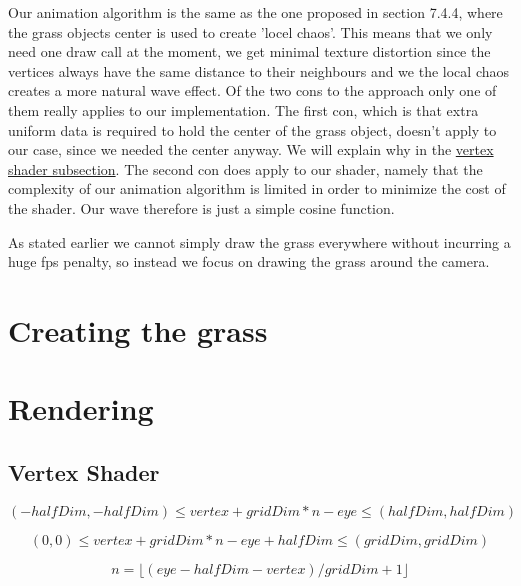 Our animation algorithm is the same as the one proposed in section
7.4.4, where the grass objects center is used to create 'locel
chaos'. This means that we only need one draw call at the moment, we
get minimal texture distortion since the vertices always have the same
distance to their neighbours and we the local chaos creates a more
natural wave effect. Of the two cons to the approach only one of them
really applies to our implementation. The first con, which is that
extra uniform data is required to hold the center of the grass object,
doesn't apply to our case, since we needed the center anyway. We will
explain why in the \hyperref[sec:grassVert]{vertex shader
  subsection}. The second con does apply to our shader, namely that
the complexity of our animation algorithm is limited in order to
minimize the cost of the shader. Our wave therefore is just a simple
cosine function.

As stated earlier we cannot simply draw the grass everywhere without
incurring a huge fps penalty, so instead we focus on drawing the grass
around the camera.

\section{Creating the grass}



\section{Rendering}


\subsection{Vertex Shader}\label{sec:grassVert}


\begin{displaymath}
  (-halfDim, -halfDim) \le vertex + gridDim * n - eye \le (halfDim, halfDim)
\end{displaymath}

\begin{displaymath}
  (0, 0) \le vertex + gridDim * n - eye + halfDim \le (gridDim, gridDim)
\end{displaymath}

\begin{displaymath}
  n = \lfloor (eye - halfDim - vertex) / gridDim + 1 \rfloor
\end{displaymath}

